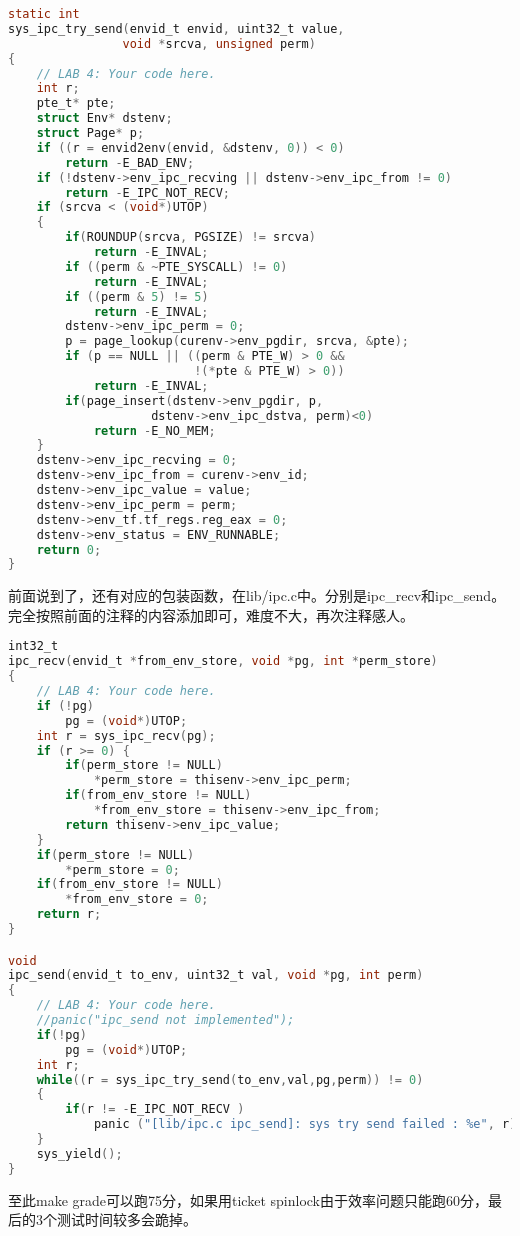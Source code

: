 \documentclass[11pt,a4paper]{article}
\begin{document}
\setmainfont{Consolas}
\begin{lstlisting}[language={C},firstnumber=1,title=kern/syscall.c]
static int
sys_ipc_try_send(envid_t envid, uint32_t value,
				void *srcva, unsigned perm)
{
	// LAB 4: Your code here.
	int r;
	pte_t* pte;
	struct Env* dstenv;
	struct Page* p;
	if ((r = envid2env(envid, &dstenv, 0)) < 0)
		return -E_BAD_ENV;
	if (!dstenv->env_ipc_recving || dstenv->env_ipc_from != 0)
		return -E_IPC_NOT_RECV;
	if (srcva < (void*)UTOP)
	{
		if(ROUNDUP(srcva, PGSIZE) != srcva)
			return -E_INVAL;
		if ((perm & ~PTE_SYSCALL) != 0)
			return -E_INVAL;
		if ((perm & 5) != 5)
			return -E_INVAL;
		dstenv->env_ipc_perm = 0;
		p = page_lookup(curenv->env_pgdir, srcva, &pte);
		if (p == NULL || ((perm & PTE_W) > 0 && 
						  !(*pte & PTE_W) > 0))
 			return -E_INVAL;
		if(page_insert(dstenv->env_pgdir, p, 
					dstenv->env_ipc_dstva, perm)<0)
			return -E_NO_MEM;
	}
	dstenv->env_ipc_recving = 0;
	dstenv->env_ipc_from = curenv->env_id;
	dstenv->env_ipc_value = value;
	dstenv->env_ipc_perm = perm;
	dstenv->env_tf.tf_regs.reg_eax = 0;
	dstenv->env_status = ENV_RUNNABLE;
	return 0;
}
\end{lstlisting}
\setmainfont[BoldFont=黑体]{宋体}

前面说到了，还有对应的包装函数，在lib/ipc.c中。分别是ipc\_recv和ipc\_send。完全按照前面的注释的内容添加即可，难度不大，再次注释感人。

\setmainfont{Consolas}
\begin{lstlisting}[language={C},firstnumber=1,title=lib/ipc.c]
int32_t
ipc_recv(envid_t *from_env_store, void *pg, int *perm_store)
{
	// LAB 4: Your code here.
	if (!pg)
		pg = (void*)UTOP;
	int r = sys_ipc_recv(pg);
	if (r >= 0) {
		if(perm_store != NULL)
			*perm_store = thisenv->env_ipc_perm;
		if(from_env_store != NULL)
			*from_env_store = thisenv->env_ipc_from;
		return thisenv->env_ipc_value;
	}
	if(perm_store != NULL)
		*perm_store = 0;
	if(from_env_store != NULL)
		*from_env_store = 0;
	return r;
}

void
ipc_send(envid_t to_env, uint32_t val, void *pg, int perm)
{
	// LAB 4: Your code here.
	//panic("ipc_send not implemented");
	if(!pg)
		pg = (void*)UTOP; 
	int r;
	while((r = sys_ipc_try_send(to_env,val,pg,perm)) != 0)
	{
		if(r != -E_IPC_NOT_RECV )
			panic ("[lib/ipc.c ipc_send]: sys try send failed : %e", r);
	}
	sys_yield();
}
\end{lstlisting}
\setmainfont[BoldFont=黑体]{宋体}

至此make grade可以跑75分，如果用ticket spinlock由于效率问题只能跑60分，最后的3个测试时间较多会跪掉。
\end{document}
